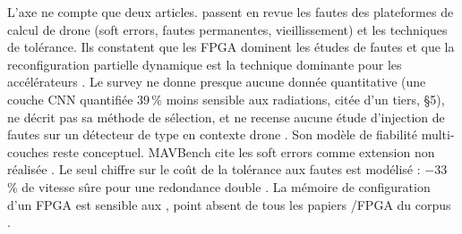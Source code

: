 L'axe ne compte que deux articles. \citet{2022-ahmed-survey-uav-computing-platforms-hardware}
passent en revue les fautes des plateformes de calcul de drone (soft errors, fautes
permanentes, vieillissement) et les techniques de tolérance. Ils constatent que les 
FPGA dominent les études de fautes et que la reconfiguration partielle dynamique est la
technique dominante pour les accélérateurs  . Le survey ne donne presque
aucune donnée quantitative (une couche CNN quantifiée 39\,\% moins sensible aux radiations,
citée d'un tiers, §5), ne décrit pas sa méthode de sélection, et ne recense aucune étude
d'injection de fautes sur un détecteur de type  en contexte drone . Son
modèle de fiabilité multi-couches reste conceptuel. MAVBench cite les soft errors comme
extension non réalisée \citep[§VI-C]{arxiv-1905.06388-mavbench-micro-aerial-vehicle-benchmarking}.
Le seul chiffre sur le coût de la tolérance aux fautes est modélisé : $-$33\,\% de vitesse
sûre pour une redondance double
\citep[§VI-C]{arxiv-2204.10898-roofline-model-uavs-bottleneck-analysis}. La mémoire de
configuration  d'un FPGA est sensible aux , point absent de tous les papiers
/FPGA du corpus \deduit.

